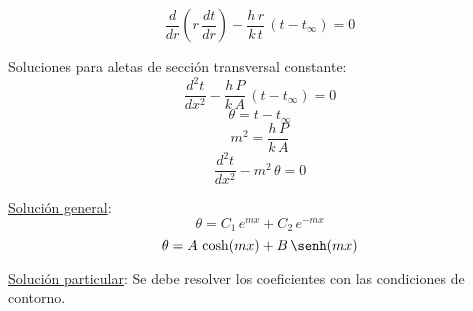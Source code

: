 
\begin{equation*}
    \frac{d}{dr}\left(r\,\frac{dt}{dr}\right)-\frac{h\,r}{k\,t}\,(t-t_{\infty}) = 0
\end{equation*}

Soluciones para aletas de sección transversal constante:
\begin{equation*}
    \frac{d^2 t}{dx^2} - \frac{h\,P}{k\,A}\,(t - t_{\infty}) = 0
\end{equation*}
\begin{equation*}
    \theta = t - t_{\infty}
\end{equation*}
\begin{equation*}
    m^2 = \frac{h\,P}{k\,A}
\end{equation*}
\begin{equation}
    \frac{d^2 t}{dx^2} - m^2\,\theta = 0
\end{equation}

\underline{Solución general}:
\begin{equation*}
    \theta = C_1\,e^{mx} + C_2\,e^{-mx}
\end{equation*}
\begin{equation*}
    \theta = A\,\cosh(mx) + B\,\senh(mx)
\end{equation*}

\underline{Solución particular}:
Se debe resolver los coeficientes con las condiciones de contorno.

